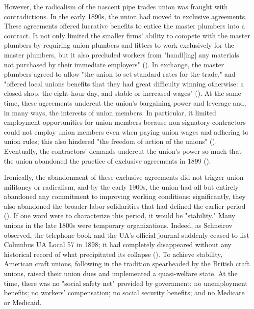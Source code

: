 \documentclass[12pt]{article}
\begin{document}
However, the radicalism of the nascent pipe trades union was fraught with contradictions. In the early 1890s, the union had moved to exclusive agreements. These agreements offered lucrative benefits to entice the master plumbers into a contract. It not only limited the smaller firms’ ability to compete with the master plumbers by requiring union plumbers and fitters to work exclusively for the master plumbers, but it also precluded workers from "handl[ing] any materials not purchased by their immediate employers" (\cite[54]{schneirovPrideSolidarityHistory1993}). In exchange, the master plumbers agreed to allow "the union to set standard rates for the trade," and "offered local unions benefits that they had great difficulty winning otherwise: a closed shop, the eight-hour day, and stable or increased wages" (\citeyear[54]{schneirovPrideSolidarityHistory1993}). At the same time, these agreements undercut the union’s bargaining power and leverage and, in many ways, the interests of union members. In particular, it limited employment opportunities for union members because non-signatory contractors could not employ union members even when paying union wages and adhering to union rules; this also hindered "the freedom of action of the unions" (\citeyear[54]{schneirovPrideSolidarityHistory1993}). Eventually, the contractors’ demands undercut the union’s power so much that the union abandoned the practice of exclusive agreements in 1899 (\citeyear[54–55]{schneirovPrideSolidarityHistory1993}).

Ironically, the abandonment of these exclusive agreements did not trigger union militancy or radicalism, and by the early 1900s, the union had all but entirely abandoned any commitment to improving working conditions; significantly, they also abandoned the broader labor solidarities that had defined the earlier period (\cite[51–54]{schneirovPrideSolidarityHistory1993}). If one word were to characterize this period, it would be "stability." Many unions in the late 1800s were temporary organizations. Indeed, as Schneirov observed, the telephone book and the UA’s official journal suddenly ceased to list Columbus UA Local 57 in 1898; it had completely disappeared without any historical record of what precipitated its collapse  (\citeyear[51]{schneirovPrideSolidarityHistory1993}). To achieve stability, American craft unions, following in the tradition spearheaded by the British craft unions, raised their union dues and implemented a quasi-welfare state. At the time, there was no "social safety net" provided by government; no unemployment benefits; no workers' compensation; no social security benefits; and no Medicare or Medicaid. 
\end{document}
